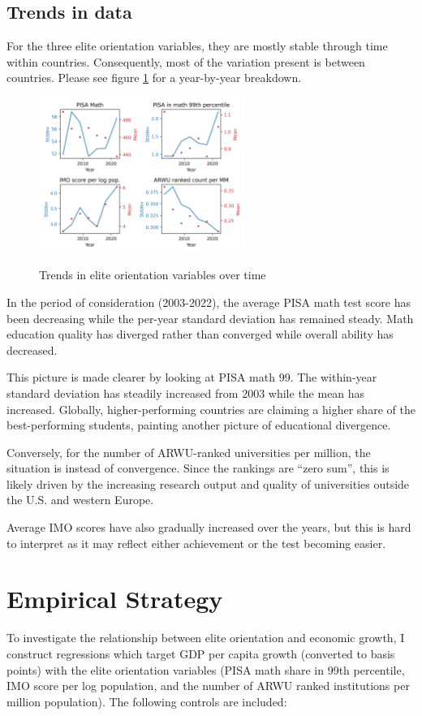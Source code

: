 \documentclass[11pt]{article}
\begin{document}
\subsection{Trends in data}
For the three elite orientation variables, they are mostly stable through time within countries. Consequently, most of the variation present is between countries. Please see figure \ref{fig:trends} for a year-by-year breakdown.
\begin{figure}[H]
    \caption{Trends in elite orientation variables over time}
    \centering
    \includegraphics[width=0.6\textwidth]{../charts/std-dev.png}
    \label{fig:trends}
\end{figure}

In the period of consideration (2003-2022), the average PISA math test score has been decreasing while the per-year standard deviation has remained steady. Math education quality has diverged rather than converged while overall ability has decreased.

This picture is made clearer by looking at PISA math 99. The within-year standard deviation has steadily increased from 2003 while the mean has increased. Globally, higher-performing countries are claiming a higher share of the best-performing students, painting another picture of educational divergence.

Conversely, for the number of ARWU-ranked universities per million, the situation is instead of convergence. Since the rankings are ``zero sum'', this is likely driven by the increasing research output and quality of universities outside the U.S. and western Europe.

Average IMO scores have also gradually increased over the years, but this is hard to interpret as it may reflect either achievement or the test becoming easier.

\section{Empirical Strategy}
To investigate the relationship between elite orientation and economic growth, I construct regressions which target GDP per capita growth (converted to basis points) with the elite orientation variables (PISA math share in 99th percentile, IMO score per log population, and the number of ARWU ranked institutions per million population). The following controls are included:
\end{document}
